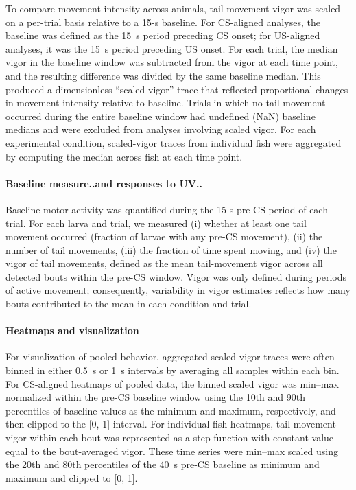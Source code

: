 To compare movement intensity across animals, tail-movement vigor was scaled on a per-trial basis relative to a 15-s baseline. For CS-aligned analyses, the baseline was defined as the \SI{15}{\second} period preceding CS onset; for US-aligned analyses, it was the \SI{15}{\second} period preceding US onset. For each trial, the median vigor in the baseline window was subtracted from the vigor at each time point, and the resulting difference was divided by the same baseline median. This produced a dimensionless ``scaled vigor'' trace that reflected proportional changes in movement intensity relative to baseline. Trials in which no tail movement occurred during the entire baseline window had undefined (NaN) baseline medians and were excluded from analyses involving scaled vigor. For each experimental condition, scaled-vigor traces from individual fish were aggregated by computing the median across fish at each time point.



\paragraph{Baseline measure..and responses to UV..}

Baseline motor activity was quantified during the 15-s pre-CS period of each trial. For each larva and trial, we measured (i) whether at least one tail movement occurred (fraction of larvae with any pre-CS movement), (ii) the number of tail movements, (iii) the fraction of time spent moving, and (iv) the vigor of tail movements, defined as the mean tail-movement vigor across all detected bouts within the pre-CS window. Vigor was only defined during periods of active movement; consequently, variability in vigor estimates reflects how many bouts contributed to the mean in each condition and trial.


\paragraph{Heatmaps and visualization}

For visualization of pooled behavior, aggregated scaled-vigor traces were often binned in either \SI{0.5}{\second} or \SI{1}{\second} intervals by averaging all samples within each bin. For CS-aligned heatmaps of pooled data, the binned scaled vigor was min--max normalized within the pre-CS baseline window using the 10th and 90th percentiles of baseline values as the minimum and maximum, respectively, and then clipped to the [0, 1] interval. For individual-fish heatmaps, tail-movement vigor within each bout was represented as a step function with constant value equal to the bout-averaged vigor. These time series were min--max scaled using the 20th and 80th percentiles of the \SI{40}{\second} pre-CS baseline as minimum and maximum and clipped to [0, 1].

